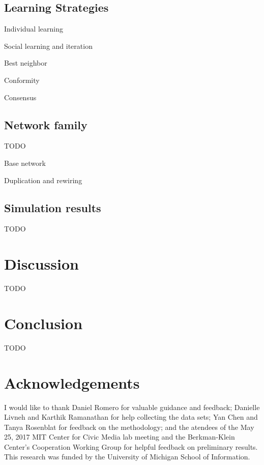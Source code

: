 \documentclass[10pt,twocolumn]{article}
\newcommand{\+}{\phantom{-}}
\begin{document}
\subsection{Learning Strategies}

Individual learning

Social learning and iteration

Best neighbor

Conformity

Consensus

\subsection{Network family}

TODO

Base network

Duplication and rewiring

\subsection{Simulation results}

TODO

\section{Discussion}
TODO

\section{Conclusion}
TODO

\section{Acknowledgements}
I would like to thank Daniel Romero for valuable guidance and feedback;
Danielle Livneh and Karthik Ramanathan for help collecting the data sets;
Yan Chen and Tanya Rosenblat for feedback on the methodology;
and the atendees of the May 25, 2017 MIT Center for Civic Media lab meeting and
the Berkman-Klein Center's Cooperation Working Group for helpful feedback on
preliminary results.
This research was funded by the University of Michigan School of Information.

%



 
\end{document}

